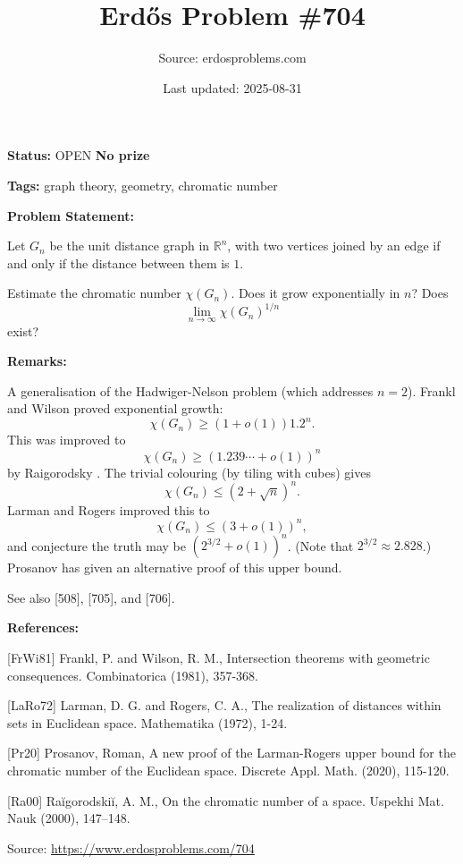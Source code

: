 \documentclass{article}
\title{Erd\H{o}s Problem \#704}
\date{Last updated: 2025-08-31}
\author{Source: erdosproblems.com}
\begin{document}
\maketitle

\noindent\textbf{Status:} OPEN \quad \textbf{No prize}

\noindent\textbf{Tags:} graph theory, geometry, chromatic number

\medskip
\noindent\textbf{Problem Statement:}

Let $G_n$ be the unit distance graph in $\mathbb{R}^n$, with two vertices joined by an edge if and only if the distance between them is $1$.

Estimate the chromatic number $\chi(G_n)$. Does it grow exponentially in $n$? Does\[\lim_{n\to \infty}\chi(G_n)^{1/n}\]exist?

\bigskip
\noindent\textbf{Remarks:}

A generalisation of the Hadwiger-Nelson problem (which addresses $n=2$). Frankl and Wilson \cite{FrWi81} proved exponential growth:\[\chi(G_n) \geq (1+o(1))1.2^n.\]This was improved to\[\chi(G_n)\geq (1.239\cdots+o(1))^n\]by Raigorodsky \cite{Ra00}. The trivial colouring (by tiling with cubes) gives\[\chi(G_n) \leq (2+\sqrt{n})^n.\]Larman and Rogers \cite{LaRo72} improved this to\[\chi(G_n) \leq (3+o(1))^n,\]and conjecture the truth may be $(2^{3/2}+o(1))^n$. (Note that $2^{3/2}\approx 2.828$.) Prosanov \cite{Pr20} has given an alternative proof of this upper bound.

See also [508], [705], and [706].

\bigskip
\noindent\textbf{References:}

[FrWi81] Frankl, P. and Wilson, R. M., Intersection theorems with geometric consequences. Combinatorica (1981), 357-368.
 
 [LaRo72] Larman, D. G. and Rogers, C. A., The realization of distances within sets in Euclidean space. Mathematika (1972), 1-24.
 
 [Pr20] Prosanov, Roman, A new proof of the Larman-Rogers upper bound for the
chromatic number of the Euclidean space. Discrete Appl. Math. (2020), 115-120.
 
 [Ra00] Ra\u igorodski\u i, A. M., On the chromatic number of a space. Uspekhi Mat. Nauk (2000), 147--148.

\bigskip
\noindent\small{Source: \url{https://www.erdosproblems.com/704}}
\end{document}
